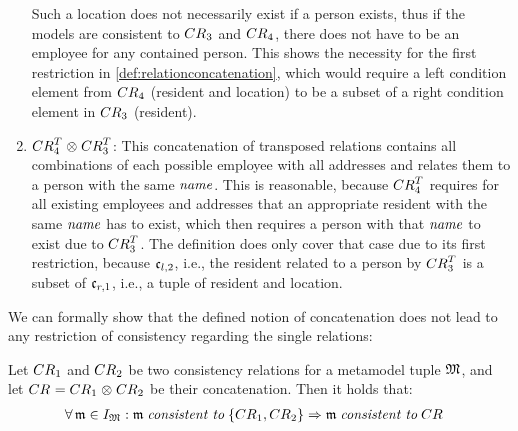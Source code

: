 \begin{example}
\begin{enumerate}
Such a location does not necessarily exist if a person exists, thus if the models are consistent to $\consistencyrelation{CR}{3}$ and $\consistencyrelation{CR}{4}$, there does not have to be an employee for any contained person.
This shows the necessity for the first restriction in \autoref{def:relationconcatenation}, which would require a left condition element from $\consistencyrelation{CR}{4}$ (resident and location) to be a subset of a right condition element in $\consistencyrelation{CR}{3}$ (resident).
    \item $\consistencyrelation{CR}{4}^T \concat \consistencyrelation{CR}{3}^T$: 
This concatenation of transposed relations contains all combinations of each possible employee with all addresses and relates them to a person with the same $\mathit{name}$.
This is reasonable, because $\consistencyrelation{CR}{4}^T$ requires for all existing employees and addresses that an appropriate resident with the same $\mathit{name}$ has to exist, which then requires a person with that $\mathit{name}$ to exist due to $\consistencyrelation{CR}{3}^T$.
The definition does only cover that case due to its first restriction, because $\conditionelement{c}{l,2}$, i.e., the resident related to a person by $\consistencyrelation{CR}{3}^T$ is a subset of $\conditionelement{c}{r,1}$, i.e., a tuple of resident and location.
\end{enumerate}
\end{example}

We can formally show that the defined notion of concatenation does not lead to any restriction of consistency regarding the single relations:

\begin{lemma} \label{lemma:concatenationimpliesconsistency}
    Let $\consistencyrelation{CR}{1}$ and $\consistencyrelation{CR}{2}$ be two consistency relations for a metamodel tuple $\metamodeltuple{M}$, and let $\consistencyrelation{CR}{} = \consistencyrelation{CR}{1} \concat \consistencyrelation{CR}{2}$ be their concatenation. Then it holds that:
    \begin{align*}
        &
        \forall \modeltuple{m} \in \metamodeltupleinstanceset{M}: \modeltuple{m} \consistenttomath \setted{\consistencyrelation{CR}{1}, \consistencyrelation{CR}{2}} \Rightarrow \modeltuple{m} \consistenttomath \consistencyrelation{CR}{}
    \end{align*}
\end{lemma}

